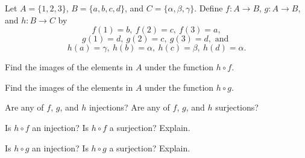 \begin{activity} \label{act:functions_1} Let $A = \{1, 2, 3\}$, $B = \{a, b, c, d\}$, and $C = \{\alpha, \beta, \gamma\}$. Define $f : A \to B$, $g : A \to B$, and $h : B \to C$ by
\[f(1) = b, \ f(2) = c, \  f(3) = a,\]
\[g(1) = d, \ g(2) = c, \  g(3) = d, \text{ and }\]
\[h(a) = \gamma, \ h(b) = \alpha, \ h(c) = \beta,  \ h(d) = \alpha.\]
\ba
\item Find the images of the elements in $A$ under the function $h \circ f$.

\item Find the images of the elements in $A$ under the function $h \circ g$.

\item Are any of $f$, $g$, and $h$ injections? Are any of $f$, $g$, and $h$ surjections?

\item Is $h \circ f$ an injection? Is $h \circ f$ a surjection? Explain.

\item Is $h \circ g$ an injection? Is $h \circ g$ a surjection? Explain.

\ea

\end{activity}

